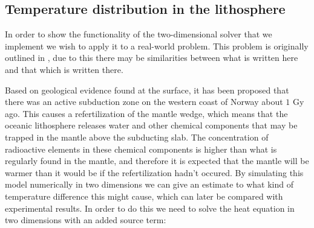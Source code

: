 \documentclass[reprint,english,notitlepage]{revtex4-1}  %
\newcommand\numberthis{\addtocounter{equation}{1}\tag{\theequation}}
\begin{document}





\subsection{Temperature distribution in the lithosphere} \label{sec:formalism_temp_dist_lithosphere}

In order to show the functionality of the two-dimensional solver that we implement we wish to apply it to a real-world problem. This problem is originally outlined in \cite[p.~4-5]{Hjorth-Jensen2020-p5}, due to this there may be similarities between what is written here and that which is written there. 

Based on geological evidence found at the surface, it has been proposed that there was an active subduction zone on the western coast of Norway about $1$ Gy ago. This causes a refertilization of the mantle wedge, which means that the oceanic lithosphere releases water and other chemical components that may be trapped in the mantle above the subducting slab. The concentration of radioactive elements in these chemical components is higher than what is regularly found in the mantle, and therefore it is expected that the mantle will be warmer than it would be if the refertilization hadn't occured. By simulating this model numerically in two dimensions we can give an estimate to what kind of temperature difference this might cause, which can later be compared with experimental results. In order to do this we need to solve the heat equation in two dimensions with an added source term:
\end{document}
